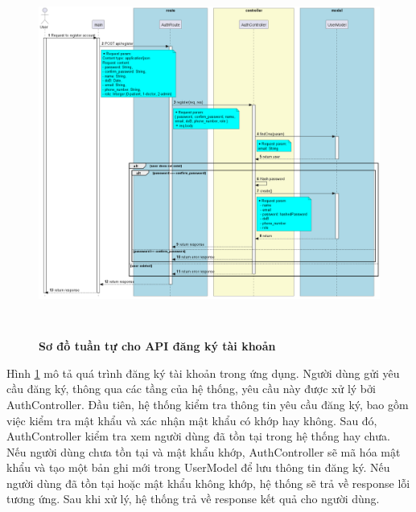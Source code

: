 \begin{enumerate}[a)]
\begin{figure}[H]
  \centering
  \includegraphics[width=16cm,height=12cm]{Images/server/sequence/server/register.png}
  \caption[Sơ đồ tuần tự cho API đăng ký tài khoản]{\bfseries \fontsize{12pt}{0pt}
  \selectfont Sơ đồ tuần tự cho API đăng ký tài khoản }
  \label{backend_register} %
\end{figure}
Hình \ref{backend_register} mô tả quá trình đăng ký tài khoản trong ứng dụng. Người dùng gửi yêu cầu đăng ký, thông qua các tầng của hệ thống, yêu cầu này được xử lý bởi AuthController. Đầu tiên, hệ thống kiểm tra thông tin yêu cầu đăng ký, bao gồm việc kiểm tra mật khẩu và xác nhận mật khẩu có khớp hay không. Sau đó, AuthController kiểm tra xem người dùng đã tồn tại trong hệ thống hay chưa. Nếu người dùng chưa tồn tại và mật khẩu khớp, AuthController sẽ mã hóa mật khẩu và tạo một bản ghi mới trong UserModel để lưu thông tin đăng ký. Nếu người dùng đã tồn tại hoặc mật khẩu không khớp, hệ thống sẽ trả về response lỗi tương ứng. Sau khi xử lý, hệ thống trả về response kết quả cho người dùng.



\end{enumerate}
